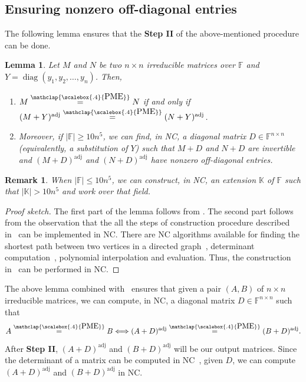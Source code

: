 \documentclass[11pt,letterpaper]{article}
\DeclareMathOperator*{\diag}{diag}
\newcommand{\F}{\mathbb{F}}
\newtheorem{lemma}{Lemma}[section]
\newtheorem{remark}{Remark}[section]
\DeclareMathOperator{\ad}{adj}
\newcommand{\adj}[1]{(#1)^{\ad}}
\newcommand{\PME}{\stackrel{\mathclap{\scalebox{.4}{\mbox{PME}}}}{=}}
\begin{document}
{{{\subsection{Ensuring nonzero off-diagonal entries} 
\label{subsec:NC-algo-performing-step-II}
The following lemma ensures that the \textbf{Step II} of the above-mentioned procedure can be done.
\begin{lemma}
\label{lem:ShiftAdjugatePreservesPME}
Let $M$ and $N$ be two $n\times n$ irreducible matrices over $\mathbb{F}$ and $Y=\diag(y_1,y_2,\dots,y_n)$. Then, 
\begin{enumerate}
\item $M\PME N$ if and only if $\adj{M+Y}\PME \adj{N+Y}$.
\item Moreover, if $|\F|\geq 10n^5$, we can find, in NC, a diagonal matrix $D\in \mathbb{F}^{n\times n}$ (equivalently, a substitution of $Y$) such that $M+D$ and $N+D$ are invertible and $\adj{M+D}$ and $\adj{N+D}$ have nonzero off-diagonal entries.
\end{enumerate}
\end{lemma}
 \begin{remark}
 When $|\F|\leq 10n^5$, we can construct, in NC, an extension $\mathbb K$ of $\F$ such that $|\mathbb K|>10n^5$ and work over that field. 
 \end{remark}

\begin{proof}[Proof sketch]
The first part of the lemma follows from \cite[Lemma~4]{Hartfiell84}. The second part follows from the observation that the all the steps of construction procedure described in~\cite[Claim~4.1]{Chatterjee25} can be implemented in NC. There are NC algorithms available for finding the shortest path between two vertices in a directed graph~\cite{Han97}, determinant computation~\cite{Csanky76, Borodin83}, polynomial interpolation and evaluation. Thus, the construction in~\cite[Claim~4.1]{Chatterjee25} can be performed in NC. 
\end{proof}


The above lemma combined with~\cite[Lemma~2.9]{Chatterjee25} ensures that given a pair $(A, B)$ of $n\times n$ irreducible matrices, we can compute, in NC, a diagonal matrix $D\in\F^{n\times n}$ such that $$A\PME B \Longleftrightarrow \adj{A+D}\PME \adj{B+D}.$$ After \textbf{Step II}, $\adj{A+D}$ and $\adj{B+D}$ will be our output matrices. Since the determinant of a matrix can be computed in NC~\cite{Csanky76, Borodin83}, given $D$, we can compute $\adj{A+D}$ and $\adj{B+D}$ in NC.

}}}
\end{document}

